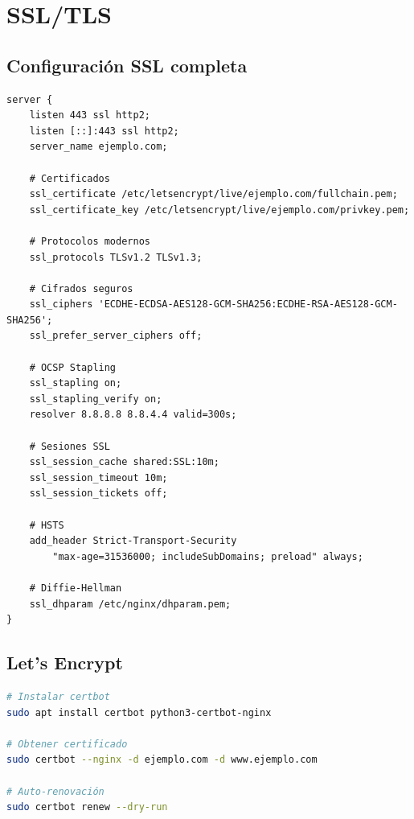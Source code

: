 \documentclass[11pt,a4paper]{article}
\begin{document}
\section{SSL/TLS}

\subsection{Configuración SSL completa}

\begin{lstlisting}[caption=SSL/TLS moderno y seguro]
server {
    listen 443 ssl http2;
    listen [::]:443 ssl http2;
    server_name ejemplo.com;
    
    # Certificados
    ssl_certificate /etc/letsencrypt/live/ejemplo.com/fullchain.pem;
    ssl_certificate_key /etc/letsencrypt/live/ejemplo.com/privkey.pem;
    
    # Protocolos modernos
    ssl_protocols TLSv1.2 TLSv1.3;
    
    # Cifrados seguros
    ssl_ciphers 'ECDHE-ECDSA-AES128-GCM-SHA256:ECDHE-RSA-AES128-GCM-SHA256';
    ssl_prefer_server_ciphers off;
    
    # OCSP Stapling
    ssl_stapling on;
    ssl_stapling_verify on;
    resolver 8.8.8.8 8.8.4.4 valid=300s;
    
    # Sesiones SSL
    ssl_session_cache shared:SSL:10m;
    ssl_session_timeout 10m;
    ssl_session_tickets off;
    
    # HSTS
    add_header Strict-Transport-Security 
        "max-age=31536000; includeSubDomains; preload" always;
    
    # Diffie-Hellman
    ssl_dhparam /etc/nginx/dhparam.pem;
}
\end{lstlisting}

\subsection{Let's Encrypt}

\begin{lstlisting}[language=bash]
# Instalar certbot
sudo apt install certbot python3-certbot-nginx

# Obtener certificado
sudo certbot --nginx -d ejemplo.com -d www.ejemplo.com

# Auto-renovación
sudo certbot renew --dry-run
\end{lstlisting}

\end{document}
